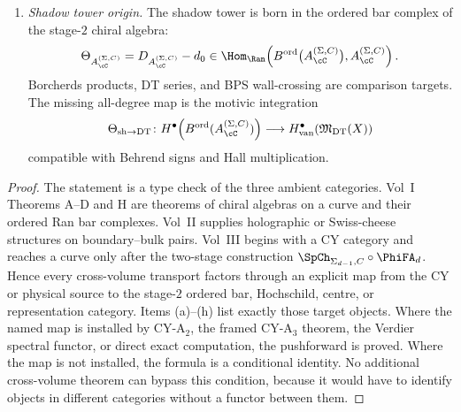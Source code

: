 \begin{theorem}
\begin{enumerate}[label=\textup{(\alph*)}]
\item \emph{Shadow tower origin.}
The shadow tower is born in the ordered bar complex of the stage-$2$
chiral algebra:
\[
 \Theta_{A_{\cC}^{(\Sigma,C)}} =
 D_{A_{\cC}^{(\Sigma,C)}}-d_0
 \in
 \Hom_{\Ran}\!\left(
 B^{\mathrm{ord}}\bigl(A_{\cC}^{(\Sigma,C)}\bigr),
 A_{\cC}^{(\Sigma,C)}
 \right).
\]
Borcherds products, DT series, and BPS wall-crossing are comparison
targets. The missing all-degree map is the motivic integration
\[
 \Theta_{\mathrm{sh}\to\mathrm{DT}}\colon
 H^\bullet\!\left(B^{\mathrm{ord}}(A_{\cC}^{(\Sigma,C)})\right)
 \longrightarrow
 H^\bullet_{\mathrm{van}}\!\left(\mathfrak M_{\mathrm{DT}}(X)\right)
\]
compatible with Behrend signs and Hall multiplication.
\end{enumerate}
\end{theorem}

\begin{proof}
The statement is a type check of the three ambient categories. Vol~I
Theorems A--D and H are theorems of chiral algebras on a curve and their
ordered Ran bar complexes. Vol~II supplies holographic or
Swiss-cheese structures on boundary--bulk pairs. Vol~III begins with a
CY category and reaches a curve only after the two-stage construction
$\SpCh_{\Sigma_{d-1},C}\circ\PhiFA_d$. Hence every cross-volume
transport factors through an explicit map from the CY or physical source
to the stage-$2$ ordered bar, Hochschild, centre, or representation
category. Items \textup{(a)}--\textup{(h)} list exactly those target
objects. Where the named map is installed by CY-A$_2$, the framed
CY-A$_3$ theorem, the Verdier spectral functor, or direct exact
computation, the pushforward is proved. Where the map is not installed,
the formula is a conditional identity. No additional
cross-volume theorem can bypass this condition, because it would have to
identify objects in different categories without a functor between them.
\end{proof}

